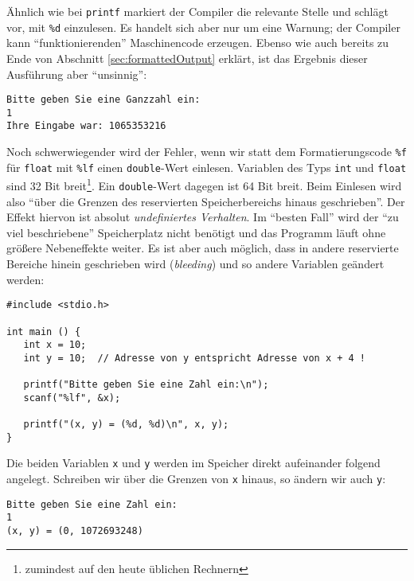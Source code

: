 Ähnlich wie bei \texttt{printf} markiert der Compiler die relevante Stelle und schlägt vor, mit \texttt{\%d} einzulesen. Es handelt sich aber nur um eine Warnung; der Compiler kann \enquote{funktionierenden} Maschinencode erzeugen. Ebenso wie auch bereits zu Ende von Abschnitt \ref{sec:formattedOutput} erklärt, ist das Ergebnis dieser Ausführung aber \enquote{unsinnig}:

\begin{cmdbox}
\begin{verbatim}
Bitte geben Sie eine Ganzzahl ein:
1
Ihre Eingabe war: 1065353216
\end{verbatim}
\end{cmdbox}

Noch schwerwiegender wird der Fehler, wenn wir statt dem Formatierungscode \texttt{\%f} für \texttt{float} mit \texttt{\%lf} einen \texttt{double}-Wert einlesen.
Variablen des Typs \texttt{int} und \texttt{float} sind 32 Bit breit\footnote{zumindest auf den heute üblichen Rechnern}. Ein \texttt{double}-Wert dagegen ist 64 Bit breit. Beim Einlesen wird also \enquote{über die Grenzen des reservierten Speicherbereichs hinaus geschrieben}. Der Effekt hiervon ist absolut \emph{undefiniertes Verhalten}. Im \enquote{besten Fall} wird der \enquote{zu viel beschriebene} Speicherplatz nicht benötigt und das Programm läuft ohne größere Nebeneffekte weiter. Es ist aber auch möglich, dass in andere reservierte Bereiche hinein geschrieben wird (\emph{bleeding}) und so andere Variablen geändert werden:

\begin{warnbox}[Beispiel: Fehler bei \texttt{scanf}: bleeding, leftupper=7mm]
\begin{verbatim}
#include <stdio.h>

int main () {
   int x = 10;
   int y = 10;  // Adresse von y entspricht Adresse von x + 4 !

   printf("Bitte geben Sie eine Zahl ein:\n");
   scanf("%lf", &x);

   printf("(x, y) = (%d, %d)\n", x, y);
}
\end{verbatim}
\end{warnbox}

Die beiden Variablen \texttt{x} und \texttt{y} werden im Speicher direkt aufeinander folgend angelegt. Schreiben wir über die Grenzen von \texttt{x} hinaus, so ändern wir auch \texttt{y}:

\begin{cmdbox}
\begin{verbatim}
Bitte geben Sie eine Zahl ein:
1
(x, y) = (0, 1072693248)
\end{verbatim}
\end{cmdbox}

